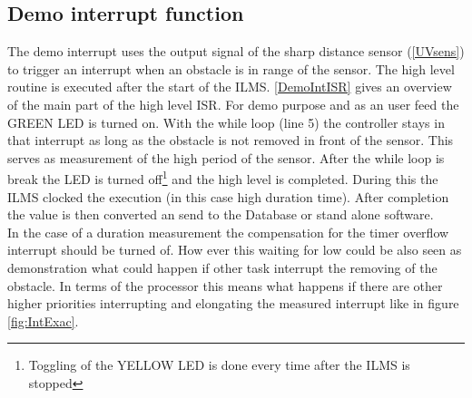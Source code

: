 \subsection{Demo interrupt function}
\label{DemoInt}
The demo interrupt uses the output signal of the sharp distance sensor (\autoref{UVsens}) to trigger an interrupt when an obstacle is in range of the sensor. The high level routine is executed after the start of the \ac{ILMS}. \autoref{DemoIntISR} gives an overview of the main part of the high level \ac{ISR}. For demo purpose and as an user feed the GREEN LED is turned on. With the while loop (line 5) the controller stays in that interrupt as long as the obstacle is not removed in front of the sensor. This serves as measurement of the high period of the sensor. After the while loop is break the LED is turned off\footnote{Toggling of the YELLOW LED is done every time after the \ac{ILMS} is stopped} and the high level is completed. During this the \ac{ILMS} clocked the execution (in this case high duration time). After completion the value is then converted an send to the Database or stand alone software.\\
In the case of a duration measurement the compensation for the timer overflow interrupt should be turned of. How ever this waiting for low could be also seen as demonstration what could happen if other task interrupt the removing of the obstacle. In terms of the processor this means what happens if there are other higher priorities interrupting and elongating the measured interrupt like in figure \ref{fig:IntExac}.

